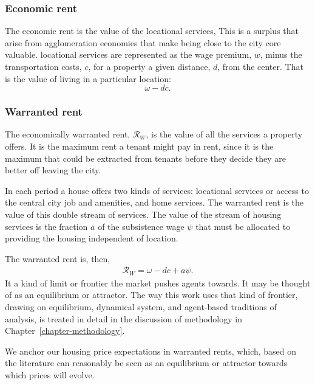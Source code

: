 \subsubsection{Economic rent} \label{section-economic-rent}
The economic rent is the value of the locational services, 
This is a surplus that arise from agglomeration economies that make being close to the city core valuable. \Gls{locational services} are represented as %
the wage premium, $w$, minus the transportation costs, $c$, for a property a given distance, $d$, from the center. That is the value of living in a particular location:
\[\omega- {dc}.\]

\subsubsection{Warranted rent} \label{section-waranted-rent}

The economically \gls{warranted rent}, $\mathcal{R}_W$, is the value of all  the services a property offers. %
It is the maximum rent  a tenant might pay in rent, since it is the maximum that could be extracted from tenants before they decide they are better off leaving the city.  

In each period a house offers two kinds of services: {locational services} or  access to the central city job and amenities, and {home services}.  The {warranted rent} is the value of this double stream of services.  The value of the stream of housing services is the fraction $a$ of the subsistence wage $\psi$ that must be allocated to providing the housing independent of location. 

 The warranted rent is, then, 
\begin{align}
\mathcal{R}_W=\omega - {dc} + a\psi.
\label{eqn-warranted-rent}
\end{align}
 It a kind of limit or \gls{frontier} the market pushes agents towards. It may be thought of as an \gls{equilibrium} or \gls{attractor}. The way this work uses that kind of frontier, drawing on \gls{equilibrium}, \gls{dynamical system}, and \gls{agent-based} traditions of analysis, is treated in detail in the discussion of methodology in Chapter~\ref{chapter-methodology}.

 We anchor our housing price expectations in warranted rents, which, based on the literature can reasonably be seen as an equilibrium or attractor towards which prices will evolve. 


